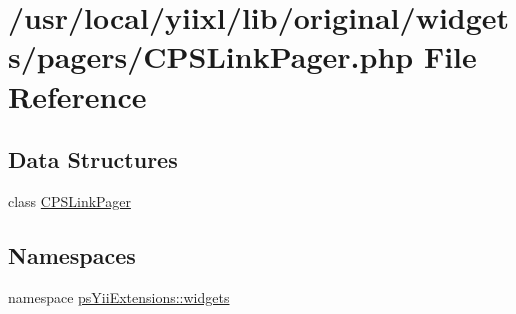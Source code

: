 \hypertarget{CPSLinkPager_8php}{
\section{/usr/local/yiixl/lib/original/widgets/pagers/CPSLinkPager.php File Reference}
\label{CPSLinkPager_8php}
}
\subsection*{Data Structures}
\begin{DoxyCompactItemize}
\item 
class \hyperlink{classCPSLinkPager}{CPSLinkPager}
\end{DoxyCompactItemize}
\subsection*{Namespaces}
\begin{DoxyCompactItemize}
\item 
namespace \hyperlink{namespacepsYiiExtensions_1_1widgets}{psYiiExtensions::widgets}
\end{DoxyCompactItemize}
